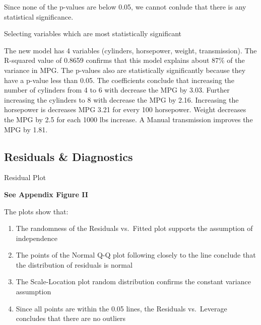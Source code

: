 \documentclass[]{article}
\newenvironment{Shaded}{\begin{snugshade}}{\end{snugshade}}
\newcommand{\KeywordTok}[1]{\textcolor[rgb]{0.13,0.29,0.53}{\textbf{#1}}}
\newcommand{\DataTypeTok}[1]{\textcolor[rgb]{0.13,0.29,0.53}{#1}}
\newcommand{\StringTok}[1]{\textcolor[rgb]{0.31,0.60,0.02}{#1}}
\newcommand{\CommentTok}[1]{\textcolor[rgb]{0.56,0.35,0.01}{\textit{#1}}}
\newcommand{\OperatorTok}[1]{\textcolor[rgb]{0.81,0.36,0.00}{\textbf{#1}}}
\newcommand{\NormalTok}[1]{#1}
\providecommand{\tightlist}{%
  \setlength{\itemsep}{0pt}\setlength{\parskip}{0pt}}
\begin{document}
\begin{Shaded}
\end{Shaded}

Since none of the p-values are below 0.05, we cannot conlude that there
is any statistical significance.

Selecting variables which are most statistically significant

\begin{Shaded}
\end{Shaded}

The new model has 4 variables (cylinders, horsepower, weight,
transmission). The R-squared value of 0.8659 confirms that this model
explains about 87\% of the variance in MPG. The p-values also are
statistically significantly because they have a p-value less than 0.05.
The coefficients conclude that increasing the number of cylinders from 4
to 6 with decrease the MPG by 3.03. Further increasing the cylinders to
8 with decrease the MPG by 2.16. Increasing the horsepower is decreases
MPG 3.21 for every 100 horsepower. Weight decreases the MPG by 2.5 for
each 1000 lbs increase. A Manual transmission improves the MPG by 1.81.

\subsection{Residuals \& Diagnostics}\label{residuals-diagnostics}

Residual Plot

\textbf{See Appendix Figure II}

The plots show that:

\begin{enumerate}
\def\labelenumi{\arabic{enumi}.}
\tightlist
\item
  The randomness of the Residuals vs.~Fitted plot supports the
  assumption of independence
\item
  The points of the Normal Q-Q plot following closely to the line
  conclude that the distribution of residuals is normal
\item
  The Scale-Location plot random distribution confirms the constant
  variance assumption
\item
  Since all points are within the 0.05 lines, the Residuals vs.~Leverage
  concludes that there are no outliers
\end{enumerate}
\end{document}
